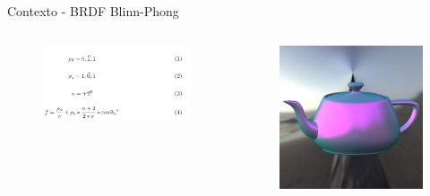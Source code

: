 \begin{frame}{Contexto - BRDF Blinn-Phong}
    \begin{columns}
        \vspace{-0.55cm}
        \hspace{1.65cm}
        \begin{figure}
            \includegraphics[scale=0.55]{./Imagens/brdfs/blinn-phong.pdf}
        \end{figure}
        
        \vspace{-0.50cm}
        \begin{figure}[H]
            \centering
            \includegraphics[height=0.32\textheight]{./Imagens/brdfs/blinn-phong-teapot.png}
            

\end{figure}
\end{columns}
\end{frame}
